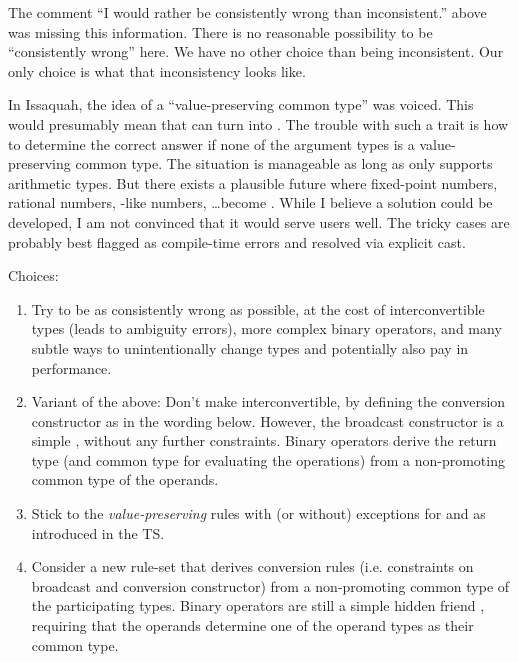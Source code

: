 The comment ``I would rather be consistently wrong than inconsistent.'' above
was missing this information.
There is no reasonable possibility to be ``consistently wrong'' here.
We have no other choice than being inconsistent.
Our only choice is what that inconsistency looks like.

In Issaquah, the idea of a ``value-preserving common type'' was voiced.
This would presumably mean that  can turn into .
The trouble with such a trait is how to determine the correct answer if none of
the argument types is a value-preserving common type.
The situation is manageable as long as  only supports arithmetic types.
But there exists a plausible future where fixed-point numbers, rational numbers,
-like numbers, \ldots become .
While I believe a solution could be developed, I am not convinced that it would
serve users well.
The tricky cases are probably best flagged as compile-time errors and resolved
via explicit cast.

Choices:
\begin{enumerate}
  \item Try to be as consistently wrong as possible, at the cost of
    interconvertible types (leads to ambiguity errors), more complex binary
    operators, and many subtle ways to unintentionally change types and
    potentially also pay in performance.

  \item\label{enum:binaryoptemplates} Variant of the above: Don't make \simd
    interconvertible, by defining the \simd conversion constructor as in the
    wording below.
    However, the broadcast constructor is a simple ,
    without any further constraints.
    Binary operators derive the return type (and common type for evaluating the
    operations) from a non-promoting common type of the operands.

  \item\label{enum:valuepreserving} Stick to the \emph{value-preserving} rules
    with (or without) exceptions for  and  as
    introduced in the TS.

  \item\label{enum:commontype} Consider a new rule-set that derives conversion
    rules (i.e. constraints on broadcast and conversion constructor) from a
    non-promoting common type of the participating types.
    Binary operators are still a simple hidden friend , requiring that the operands determine one of the
    operand types as their common type.
\end{enumerate}


